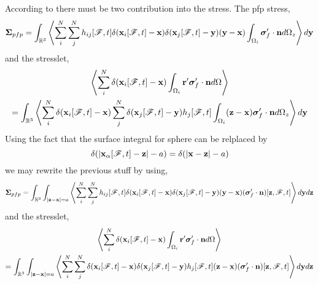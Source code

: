 \documentclass[12pt]{My_preprint}
\begin{document}
According to \citet{wang2021numerical} there must be two contribution into the stress. 
The pfp stress, 
\begin{equation}
    \bm\Sigma_{pfp}
    = 
    \int_{\mathbb{R}^3}
    \avg{
        \sum_i^N
        \sum_j^N
        h_{ij}[\FF,t]
        \delta(\textbf{x}_i[\FF,t] - \textbf{x})
        \delta(\textbf{x}_j[\FF,t] - \textbf{y})
        (\textbf{y} - \textbf{x})\intO[i]{\bm\sigma_f'\cdot\textbf{n}}_z
    }
    d\textbf{y}
\end{equation}
and the stresslet,
\begin{multline}
    \avg{
        \sum_i^N
        \delta(\textbf{x}_i[\FF,t] - \textbf{x})
        \intO[i]{\textbf{r}'\bm\sigma_f'\cdot\textbf{n}}
    }\\
    = 
    \int_{\mathbb{R}^3}
    \avg{
        \sum_i^N
        \delta(\textbf{x}_i[\FF,t] - \textbf{x})
        \sum_j^N 
        \delta(\textbf{x}_j[\FF,t] - \textbf{y})
        h_j[\FF,t]
        \intO[i]{(\textbf{z} - \textbf{x})\bm\sigma_f'\cdot\textbf{n}}_z
    }d\textbf{y}
\end{multline}
Using the fact that the surface integral for sphere can be relplaced by 
\begin{equation}
    \delta(|\textbf{x}_\alpha[\FF,t] - \textbf{z}| - a)
    = \delta(|\textbf{x} - \textbf{z}| - a)
\end{equation}
we may rewrite the previous stuff by using, 
\begin{equation}
    \bm\Sigma_{pfp}
    = 
    \int_{\mathbb{R}^3}
    \int_{|\textbf{z} - \textbf{x}| = a}
    \avg{
        \sum_i^N
        \sum_j^N
        h_{ij}[\FF,t]
        \delta(\textbf{x}_i[\FF,t] - \textbf{x})
        \delta(\textbf{x}_j[\FF,t] - \textbf{y})
        (\textbf{y} - \textbf{x})(\bm\sigma_f'\cdot\textbf{n})[\textbf{z},\FF,t]
    }
    d\textbf{y}
    d\textbf{z}
\end{equation}
and the stresslet,
\begin{multline}
    \avg{
        \sum_i^N
        \delta(\textbf{x}_i[\FF,t] - \textbf{x})
        \intO[i]{\textbf{r}'\bm\sigma_f'\cdot\textbf{n}}
    }\\
    = 
    \int_{\mathbb{R}^3}
    \int_{|\textbf{z} - \textbf{x}| = a}
    \avg{
        \sum_i^N
        \sum_j^N 
        \delta(\textbf{x}_i[\FF,t] - \textbf{x})
        \delta(\textbf{x}_j[\FF,t] - \textbf{y})
        h_j[\FF,t]
        (\textbf{z} - \textbf{x})(\bm\sigma_f'\cdot\textbf{n})[\textbf{z},\FF,t]
    }
    d\textbf{y}
    d\textbf{z}
\end{multline}
\end{document}
